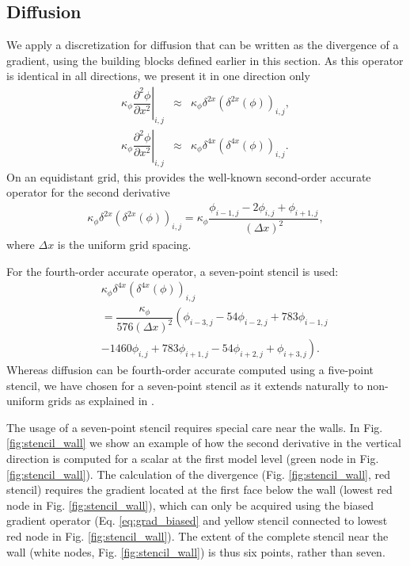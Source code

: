 \documentclass[gmd,manuscript]{copernicus}
\begin{document}
\subsection{Diffusion}
We apply a discretization for diffusion that can be written as the divergence of a gradient, using the building blocks defined earlier in this section. As this operator is identical in all directions, we present it in one direction only
\begin{eqnarray}
\left. \kappa_\phi \dfrac{\partial^2 \phi}{\partial x^2}\right|_{i,j} & \approx &
\kappa_\phi \delta^{2x} \left( \delta^{2x} \left( \phi \right) \right)_{i,j},\\
\left. \kappa_\phi \dfrac{\partial^2 \phi}{\partial x^2}\right|_{i,j} & \approx &
\kappa_\phi \delta^{4x} \left( \delta^{4x} \left( \phi \right) \right)_{i,j}.
\end{eqnarray}
On an equidistant grid, this provides the well-known second-order accurate operator for the second derivative
\begin{eqnarray}
\kappa_\phi \delta^{2x} \left( \delta^{2x} \left( \phi \right) \right)_{i,j} =
\kappa_\phi \dfrac{ \phi_{i-1,j} - 2 \phi_{i,j} + \phi_{i+1,j} }{\left( \Delta x \right)^2},\label{eq:diff_2nd}
\end{eqnarray}
where $\Delta x$ is the uniform grid spacing.

For the fourth-order accurate operator, a seven-point stencil is used:
\begin{eqnarray}
\nonumber
&& \kappa_\phi \delta^{4x} \left( \delta^{4x} \left( \phi \right) \right)_{i,j}\\
\nonumber
&& = \dfrac{\kappa_\phi}{576 \left( \Delta x \right)^2} \left( \phi_{i-3,j} - 54 \phi_{i-2,j} + 783 \phi_{i-1,j}\right.\\
&&  \left. - 1460  \phi_{i,j} + 783 \phi_{i+1,j} - 54 \phi_{i+2,j} + \phi_{i+3,j} \right).\label{eq:diff_4th}
\end{eqnarray}
Whereas diffusion can be fourth-order accurate computed using a five-point stencil, we have chosen for a seven-point stencil as it extends naturally to non-uniform grids as explained in \citet{Castillo1995}.

The usage of a seven-point stencil requires special care near the walls. In Fig. \ref{fig:stencil_wall} we show an example of how the second derivative in the vertical direction is computed for a scalar at the first model level (green node in Fig. \ref{fig:stencil_wall}). The calculation of the divergence (Fig. \ref{fig:stencil_wall}, red stencil) requires the gradient located at the first face below the wall (lowest red node in Fig. \ref{fig:stencil_wall}), which can only be acquired using the biased gradient operator (Eq. \ref{eq:grad_biased} and yellow stencil connected to lowest red node in Fig. \ref{fig:stencil_wall}). The extent of the complete stencil near the wall (white nodes, Fig. \ref{fig:stencil_wall}) is thus six points, rather than seven.
\end{document}
